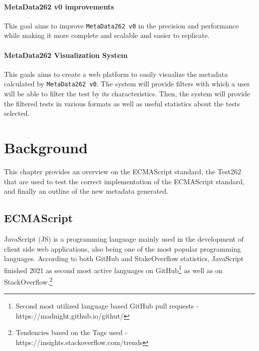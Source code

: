 \documentclass[runningheads]{llncs}
\begin{document}
\paragraph{MetaData262 v0 improvements}
This goal aims to improve \texttt{MetaData262 v0} in the precision and performance while making it more complete and scalable and easier to replicate.

\paragraph{MetaData262 Visualization System}
This goals aims to create a web platform to easily visualize the metadata calculated by \texttt{MetaData262 v0}. The system will provide filters with which a user will be able to filter the test by its characteristics. Then, the system will provide the filtered tests in various formats as well as useful statistics about the tests selected.


\section{Background}
\label{sec:Background}
This chapter provides an overview on the ECMAScript standard, the Test262 that are used to test the correct implementation of the ECMAScript standard, and finally an outline of the new metadata generated.

\subsection{ECMAScript}
\label{subsec:ECMAScript}

JavaScript (JS) is a programming language mainly used in the development of client side web applications, also being one of the most popular programming languages. According to both GitHub and StakeOverflow statistics, JavaScript finished 2021 as second most active languages on GitHub\footnote{Second most utilized language based GitHub pull requests - https://madnight.github.io/githut/} as well as on StackOverflow.\footnote{Tendencies based on the Tags used - https://insights.stackoverflow.com/trends}
\end{document}
